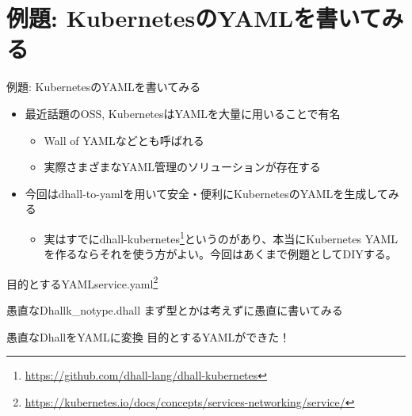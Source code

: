 \documentclass[unicode,12pt]{beamer}
\begin{document}
\section{例題: KubernetesのYAMLを書いてみる}

\begin{frame}{例題: KubernetesのYAMLを書いてみる}
  \begin{itemize}
  \item 最近話題のOSS, KubernetesはYAMLを大量に用いることで有名
    \begin{itemize}
    \item Wall of YAMLなどとも呼ばれる
    \item 実際さまざまなYAML管理のソリューションが存在する
    \end{itemize}
  \item 今回は{\ttfamily dhall-to-yaml}を用いて安全・便利にKubernetesのYAMLを生成してみる
    \begin{itemize}
    \item 実はすでにdhall-kubernetes\footnote{\url{https://github.com/dhall-lang/dhall-kubernetes}}というのがあり、本当にKubernetes YAML
      を作るならそれを使う方がよい。今回はあくまで例題としてDIYする。
    \end{itemize}
  \end{itemize}
\end{frame}

\begin{frame}{目的とするYAML}{{\ttfamily service.yaml}\footnote{\url{https://kubernetes.io/docs/concepts/services-networking/service/}}}
  
\end{frame}

\begin{frame}{愚直なDhall}{\ttfamily k\_notype.dhall}
  まず型とかは考えずに愚直に書いてみる
  
\end{frame}

\begin{frame}{愚直なDhallをYAMLに変換}
  目的とするYAMLができた！
  
\end{frame}
\end{document}
